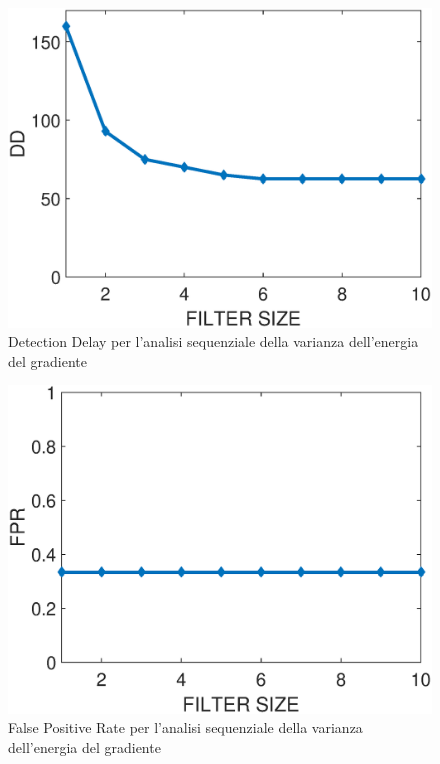\begin{figure}[tb]
	\centering
	\includegraphics[width=13cm]{diagrammi/DD}
	\caption{Detection Delay per l'analisi sequenziale della varianza dell'energia del gradiente}
	\label{fig:DD}
\end{figure}
\begin{figure}[tb]
	\centering
	\includegraphics[width=13cm]{diagrammi/FPR}
	\caption{False Positive Rate per l'analisi sequenziale della varianza dell'energia del gradiente}
	\label{fig:FPR}
\end{figure}
